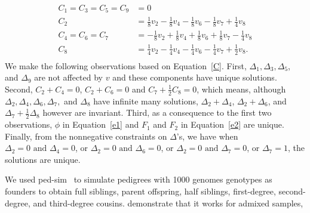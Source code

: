 \documentclass[11pt,Times]{article}
\def\cite{\citep}
\begin{document}
\begin{equation}\label{C}
\begin{aligned}
C_1 =C_3=C_5=C_9 &= 0 \\
C_2  &=  \frac{1}{8} v_2 -  \frac{1}{8} v_4 -  \frac{1}{8} v_6 -  \frac{1}{8} v_7 +  \frac{1}{4} v_8 \\  
C_4 =  C_6 = C_7 &=  - \frac{1}{8} v_2 +  \frac{1}{8} v_4 +  \frac{1}{8} v_6 +  \frac{1}{8} v_7 -  \frac{1}{4} v_8 \\
  C_8 &= \frac{1}{4} v_2 - \frac{1}{4}  v_4 - \frac{1}{4}  v_6 - \frac{1}{4}  v_7 + \frac{1}{2}  v_8. \\
\end{aligned}
\end{equation}
We make the following observations based on Equation~\eqref{C}.  First,  $\Delta_1, \Delta_3, \Delta_5$, and $\Delta_9$ are not affected by $v$ and these components have unique solutions. Second, $C_2 + C_4 = 0$, $C_2+C_6 = 0$ and $C_7 + \frac{1}{2}C_8 = 0$, which means,  although $\Delta_2, \Delta_4, \Delta_6, \Delta_7,$ and $\Delta_8$ have infinite many solutions, $\Delta_2+\Delta_4 $, $\Delta_2+\Delta_6$, and  $\Delta_7 + \frac{1}{2}\Delta_8$ however are invariant. Third, as a consequence to the first two observations, $\phi$ in Equation~\eqref{e1} and $F_1$ and $F_2$ in Equation~\eqref{e2} are unique. 
Finally, from the nonnegative constraints on $\Delta$'s, we have when $\Delta_2 = 0 \mbox{ and } \Delta_4 = 0$, or $\Delta_2 = 0 \mbox{ and } \Delta_6 = 0$, or  $\Delta_2 = 0 \mbox{ and } \Delta_7 = 0$, or $\Delta_7 = 1$, the solutions are unique.  

\newpage
\vspace{.2in} 
We used ped-sim~\cite{ped-sim} to simulate pedigrees with 1000 genomes genotypes as founders to obtain full siblings, parent offspring, half siblings, first-degree, second-degree, and third-degree cousins. 
demonstrate that it works for admixed samples, 
\end{document}
